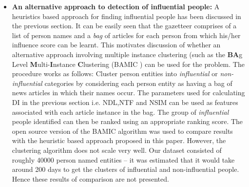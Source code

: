 \begin{itemize}
\item \textbf {An alternative approach to detection of influential people: }
A heuristics based approach for finding influential people has been discussed in the previous section. It can be easily seen that the gazetteer comprises of a list of person names and a \emph{bag} of articles for each person from which his/her influence score can be learnt. This motivates discussion of whether an alternative approach involving multiple instance clustering (such as the \textbf{BA}g Level \textbf{M}ulti-\textbf{I}nstance \textbf{C}lustering (BAMIC \cite{zhang2009multi}) can be used for the problem. The procedure works as follows: 
 Cluster person entities into \emph{influential} or \emph{non-influential} categories by considering each person entity as having a bag of news articles in which their names occur.
The parameters used for calculating DI in the previous section i.e. NDL,NTF and NSIM can be used as features associated with each article instance in the bag. The group of \emph{influential} people identified can then be ranked using an appropriate ranking score.
The open source version of the BAMIC algorithm was used to compare results with the heuristic based approach proposed in this paper. However, the clustering algorithm does not scale very well. Our dataset consisted of roughly 40000 person named entities -- it was estimated that it would take around 200 days to get the clusters of influential and non-influential people.  Hence these results of comparison are not presented. 
\end{itemize}